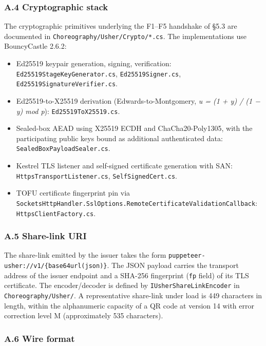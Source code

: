 \documentclass[
]{article}
\providecommand{\tightlist}{%
  \setlength{\itemsep}{0pt}\setlength{\parskip}{0pt}}
\begin{document}
\subsubsection{A.4 Cryptographic stack}\label{a.4-cryptographic-stack}

The cryptographic primitives underlying the F1--F5 handshake of §5.3 are
documented in \texttt{Choreography/Usher/Crypto/*.cs}. The
implementations use BouncyCastle 2.6.2:

\begin{itemize}
\tightlist
\item
  Ed25519 keypair generation, signing, verification:
  \texttt{Ed25519StageKeyGenerator.cs}, \texttt{Ed25519Signer.cs},
  \texttt{Ed25519SignatureVerifier.cs}.
\item
  Ed25519-to-X25519 derivation (Edwards-to-Montgomery, \emph{u = (1 + y)
  / (1 − y) mod p}): \texttt{Ed25519ToX25519.cs}.
\item
  Sealed-box AEAD using X25519 ECDH and ChaCha20-Poly1305, with the
  participating public keys bound as additional authenticated data:
  \texttt{SealedBoxPayloadSealer.cs}.
\item
  Kestrel TLS listener and self-signed certificate generation with SAN:
  \texttt{HttpsTransportListener.cs}, \texttt{SelfSignedCert.cs}.
\item
  TOFU certificate fingerprint pin via
  \texttt{SocketsHttpHandler.SslOptions.RemoteCertificateValidationCallback}:
  \texttt{HttpsClientFactory.cs}.
\end{itemize}

\subsubsection{A.5 Share-link URI}\label{a.5-share-link-uri}

The share-link emitted by the issuer takes the form
\texttt{puppeteer-usher://v1/\{base64url(json)\}}. The JSON payload
carries the transport address of the issuer endpoint and a SHA-256
fingerprint (\texttt{fp} field) of its TLS certificate. The
encoder/decoder is defined by \texttt{IUsherShareLinkEncoder} in
\texttt{Choreography/Usher/}. A representative share-link under load is
449 characters in length, within the alphanumeric capacity of a QR code
at version 14 with error correction level M (approximately 535
characters).

\subsubsection{A.6 Wire format}\label{a.6-wire-format}
\end{document}

